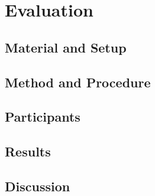 \chapter{Evaluation}

\section{Material and Setup}

\section{Method and Procedure}

\section{Participants}

\section{Results}

\section{Discussion}